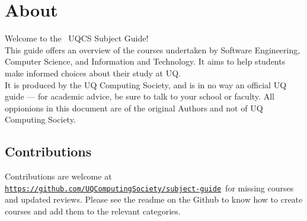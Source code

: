 \section{About}
\hypertarget{core:about}{}
Welcome to the \the\year\ UQCS Subject Guide!\\

\noindent
This guide offers an overview of the courses undertaken by Software Engineering, Computer Science, and Information and Technology.
It aims to help students make informed choices about their study at UQ.\\

\noindent
It is produced by the UQ Computing Society, and is in no way an official UQ guide --- for academic advice, be sure to talk to your school or faculty.
All oppionions in this document are of the original Authors and not of UQ Computing Society.

\subsection{Contributions}

Contributions are welcome at \href{https://github.com/UQComputingSociety/subject-guide}{\nolinkurl{https://github.com/UQComputingSociety/subject-guide}}\ for missing courses and updated reviews. Please see the readme
on the Github to know how to create courses and add them to the relevant categories.